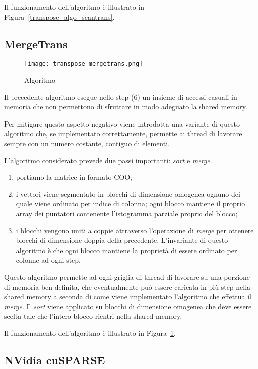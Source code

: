 Il funzionamento dell'algoritmo è illustrato in Figura~\ref{transpose_algo_scantrans}. 

\subsection{MergeTrans}

\begin{figure}[htbp]
    \centering
	\texttt{[image: transpose\_mergetrans.png]}
	\caption{Algoritmo \MergeTrans}
	\label{transpose_algo_mergerans}
\end{figure}
	
Il precedente algoritmo esegue nello step (6) un insieme di accessi casuali in memoria che non permettono di sfruttare in modo adeguato la shared memory. 

Per mitigare questo aspetto negativo viene introdotta una variante di questo algoritmo che, se implementato correttamente, permette ai thread di lavorare sempre con un numero costante, contiguo di elementi. 
	
L'algoritmo considerato prevede due passi importanti: \textit{sort} e \textit{merge}.
\begin{enumerate}
    \item portiamo la matrice in formato COO;
    \item i vettori viene segmentato in blocchi di dimensione omogenea ognuno dei quale viene ordinato per indice di colonna; ogni blocco mantiene il proprio array dei puntatori contenente l'istogramma parziale proprio del blocco;
    \item i blocchi vengono uniti a coppie attraverso l'operazione di \emph{merge} per ottenere blocchi di dimensione doppia della precedente. L'invariante di questo algoritmo è che ogni blocco mantiene la proprietà di essere ordinato per colonne ad ogni step.
\end{enumerate}

Questo algoritmo permette ad ogni griglia di thread di lavorare su una porzione di memoria ben definita, che eventualmente può essere caricata in più step nella shared memory a seconda di come viene implementato l'algoritmo che effettua il \emph{merge}. Il \emph{sort} viene applicato su blocchi di dimensione omogenea che deve essere scelta tale che l'intero blocco rientri nella shared memory.

Il funzionamento dell'algoritmo è illustrato in Figura~\ref{transpose_algo_mergerans}. 


\subsection{NVidia cuSPARSE}

